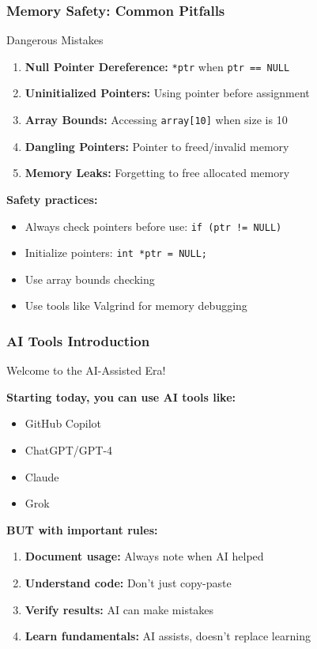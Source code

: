 \documentclass{beamer}
\begin{document}
\begin{frame}
\frametitle{Memory Safety: Common Pitfalls}
\begin{alertblock}{Dangerous Mistakes}
\footnotesize
\begin{enumerate}
    \item \footnotesize \textbf{Null Pointer Dereference:} \texttt{*ptr} when \texttt{ptr == NULL}
    \item \footnotesize \textbf{Uninitialized Pointers:} Using pointer before assignment
    \item \footnotesize \textbf{Array Bounds:} Accessing \texttt{array[10]} when size is 10
    \item \footnotesize \textbf{Dangling Pointers:} Pointer to freed/invalid memory
    \item \footnotesize \textbf{Memory Leaks:} Forgetting to free allocated memory
\end{enumerate}
\end{alertblock}

\vspace{0.3cm}
\footnotesize
\textbf{Safety practices:}
\begin{itemize}
    \item \footnotesize Always check pointers before use: \texttt{if (ptr != NULL)}
    \item \footnotesize Initialize pointers: \texttt{int *ptr = NULL;}
    \item \footnotesize Use array bounds checking
    \item \footnotesize Use tools like Valgrind for memory debugging
\end{itemize}
\end{frame}

\begin{frame}
\frametitle{AI Tools Introduction}
\begin{center}
\Large Welcome to the AI-Assisted Era!
\end{center}

\textbf{Starting today, you can use AI tools like:}
\begin{itemize}
    \item GitHub Copilot
    \item ChatGPT/GPT-4
    \item Claude
    \item Grok
\end{itemize}

\vspace{0.5cm}
\textbf{BUT with important rules:}
\begin{enumerate}
    \item \textbf{Document usage:} Always note when AI helped
    \item \textbf{Understand code:} Don't just copy-paste
    \item \textbf{Verify results:} AI can make mistakes
    \item \textbf{Learn fundamentals:} AI assists, doesn't replace learning
\end{enumerate}
\end{frame}
\end{document}
